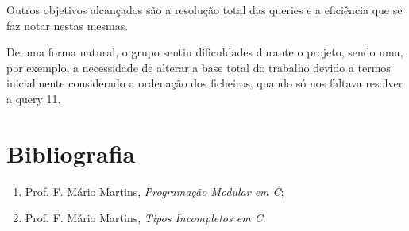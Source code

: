 \documentclass[a4paper]{article}
\begin{document}
Outros objetivos alcançados são a resolução total das queries e a eficiência
que se faz notar nestas mesmas.

De uma forma natural, o grupo sentiu dificuldades durante o projeto, sendo 
uma, por exemplo, a necessidade de alterar a base total do trabalho devido
a termos inicialmente considerado a ordenação dos ficheiros, quando só nos
faltava resolver a query 11.

\section{Bibliografia}

\begin{enumerate} 
	\item Prof. F. Mário Martins, \textit{Programação Modular em C};
	\item Prof. F. Mário Martins, \textit{Tipos Incompletos em C}.
\end{enumerate}
\end{document}

